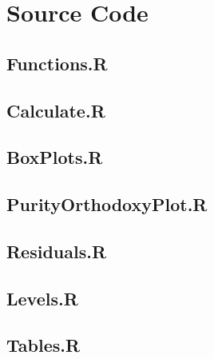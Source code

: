 \chapter{Source Code}

\section{Functions.R}\label{src:functions}


\section{Calculate.R}\label{src:calculate}


\section{BoxPlots.R}\label{src:boxPlots}


\section{PurityOrthodoxyPlot.R}\label{src:purityOrthodoxyPlot}


\section{Residuals.R}\label{src:residuals}


\section{Levels.R}\label{src:levels}


\section{Tables.R}\label{src:tables}

